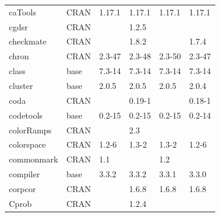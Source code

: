 \begin{longtable}{llllll}
\rowcolor{black!5}
caTools                       & CRAN                      & 1.17.1      & 1.17.1      & 1.17.1         & 1.17.1             \\
\rowcolor{black!10}
cgdsr                         & CRAN                      &             & 1.2.5       &                &                   \\
\rowcolor{black!5}
checkmate                     & CRAN                      &             & 1.8.2       &                & 1.7.4              \\
\rowcolor{black!10}
chron                         & CRAN                      & 2.3-47      & 2.3-48      & 2.3-50         & 2.3-47            \\
\rowcolor{black!5}
class                         & base                      & 7.3-14      & 7.3-14      & 7.3-14         & 7.3-14             \\
\rowcolor{black!10}
cluster                       & base                      & 2.0.5       & 2.0.5       & 2.0.5          & 2.0.4             \\
\rowcolor{black!5}
coda                          & CRAN                      &             & 0.19-1      &                & 0.18-1             \\
\rowcolor{black!10}
codetools                     & base                      & 0.2-15      & 0.2-15      & 0.2-15         & 0.2-14            \\
\rowcolor{black!5}
colorRamps                    & CRAN                      &             & 2.3         &                &                    \\
\rowcolor{black!10}
colorspace                    & CRAN                      & 1.2-6       & 1.3-2       & 1.3-2          & 1.2-6             \\
\rowcolor{black!5}
commonmark                    & CRAN                      & 1.1         &             & 1.2            &                    \\
\rowcolor{black!10}
compiler                      & base                      & 3.3.2       & 3.3.2       & 3.3.1          & 3.3.0             \\
\rowcolor{black!5}
corpcor                       & CRAN                      &             & 1.6.8       & 1.6.8          & 1.6.8              \\
\rowcolor{black!10}
Cprob                         & CRAN                      &             & 1.2.4       &                &                   \\

\end{longtable}
